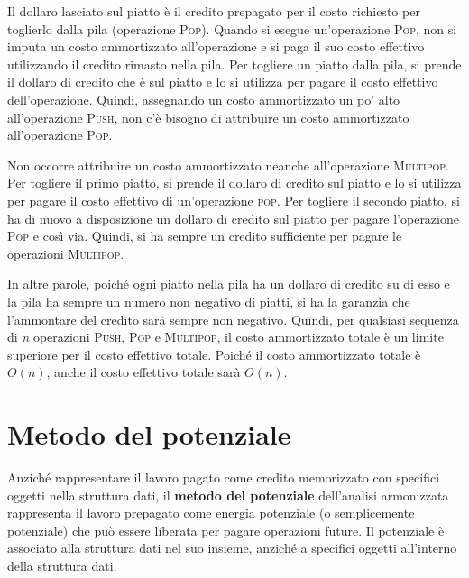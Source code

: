 \documentclass[10pt, a4paper]{report}
\begin{document}
Il dollaro lasciato sul piatto è il credito prepagato per il costo richiesto per toglierlo dalla pila (operazione \textsc{Pop}). Quando si esegue un'operazione \textsc{Pop}, non si imputa un costo ammortizzato all'operazione e si paga il suo costo effettivo utilizzando il credito rimasto nella pila. Per togliere un piatto dalla pila, si prende il dollaro di credito che è sul piatto e lo si utilizza per pagare il costo effettivo dell'operazione. Quindi, assegnando un costo ammortizzato un po' alto all'operazione \textsc{Push}, non c'è bisogno di attribuire un costo ammortizzato all'operazione \textsc{Pop}.

Non occorre attribuire un costo ammortizzato neanche all'operazione \textsc{Multipop}. Per togliere il primo piatto, si prende il dollaro di credito sul piatto e lo si utilizza per pagare il costo effettivo di un'operazione \textsc{pop}. Per togliere il secondo piatto, si ha di nuovo a disposizione un dollaro di credito sul piatto per pagare l'operazione \textsc{Pop} e così via. Quindi, si ha sempre un credito sufficiente per pagare le operazioni \textsc{Multipop}.

In altre parole, poiché ogni piatto nella pila ha un dollaro di credito su di esso e la pila ha sempre un numero non negativo di piatti, si ha la garanzia che l'ammontare del credito sarà sempre non negativo. Quindi, per qualsiasi sequenza di \textit{n} operazioni \textsc{Push}, \textsc{Pop} e \textsc{Multipop}, il costo ammortizzato totale è un limite superiore per il costo effettivo totale. Poiché il costo ammortizzato totale è $O(n)$, anche il costo effettivo totale sarà $O(n)$.
\section{Metodo del potenziale}
Anziché rappresentare il lavoro pagato come credito memorizzato con specifici oggetti nella struttura dati, il \textbf{metodo del potenziale} dell'analisi armonizzata rappresenta il lavoro prepagato come energia potenziale (o semplicemente potenziale) che può essere liberata per pagare operazioni future. Il potenziale è associato alla struttura dati nel suo insieme, anziché a specifici oggetti all'interno della struttura dati.
\end{document}
